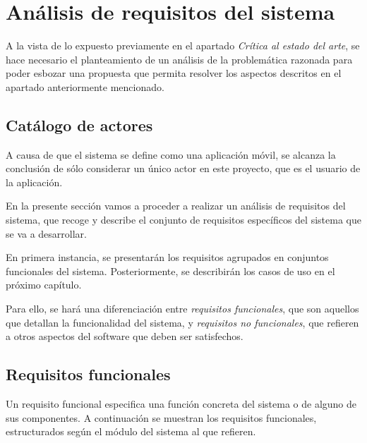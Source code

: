 


\chapter{Análisis de requisitos del sistema}
A la vista de lo expuesto previamente en el apartado 
\textit{Crítica al estado del arte}, se hace necesario el 
planteamiento de un análisis de la problemática razonada para 
poder esbozar una propuesta que permita resolver los aspectos 
descritos en el apartado anteriormente mencionado.\medskip

\section{Catálogo de actores}
A causa de que el sistema se define como una aplicación móvil, 
se alcanza la conclusión de sólo considerar un único actor en 
este proyecto, que es el usuario de la aplicación.

En la presente sección vamos a proceder a realizar un análisis de 
requisitos del sistema, que recoge y describe el conjunto 
de requisitos específicos del sistema que se va a desarrollar.\medskip

En primera instancia, se presentarán los requisitos agrupados en 
conjuntos funcionales del sistema. Posteriormente, se describirán 
los casos de uso en el próximo capítulo. \medskip

Para ello, se hará una diferenciación entre 
\textit{requisitos funcionales}, que son aquellos que detallan 
la funcionalidad del sistema, y \textit{requisitos no funcionales},
que refieren a otros aspectos del software que deben ser satisfechos.


\section{Requisitos funcionales}
Un requisito funcional especifica una función concreta del sistema o 
de alguno de sus componentes. A continuación se muestran los requisitos 
funcionales, estructurados según el módulo del sistema al que refieren.
        
